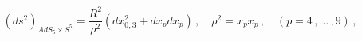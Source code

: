 \begin{equation}
\label{ads1} \left(ds^2\right)_{AdS_5 \times
S^5}=\frac{R^2}{\rho^2} \left(dx_{0,3}^2 + dx_p
dx_p\right)\,,\quad \rho^2=x_p x_p\,, \quad (p=4\,,\ldots\,,9)\,,
\end{equation}

